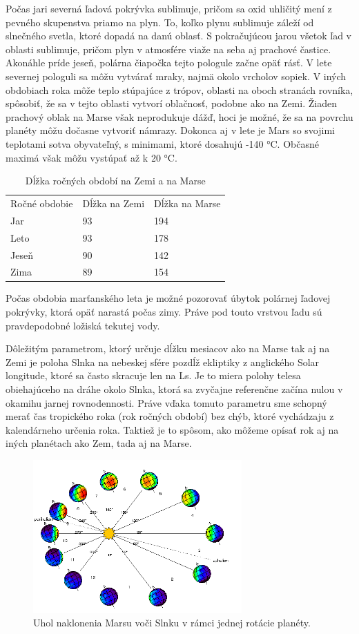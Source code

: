\newline Počas jari severná ľadová pokrývka sublimuje, pričom sa oxid uhličitý mení z pevného skupenstva priamo na plyn. To, koľko plynu sublimuje záleží od slnečného svetla, ktoré dopadá na danú oblasť. S pokračujúcou jarou všetok ľad v oblasti sublimuje, pričom plyn v atmosfére viaže na seba aj prachové častice. Akonáhle príde jeseň, polárna čiapočka tejto pologule začne opäť rásť. V lete severnej pologuli sa môžu vytvárať mraky, najmä okolo vrcholov sopiek. V iných obdobiach roka môže teplo stúpajúce z trópov, oblasti na oboch stranách rovníka, spôsobiť, že sa v tejto oblasti vytvorí oblačnosť, podobne ako na Zemi. Žiaden prachový oblak na Marse však neprodukuje dážď, hoci je možné, že sa na povrchu planéty môžu dočasne vytvoriť námrazy. Dokonca aj v lete je Mars so svojimi teplotami sotva obyvateľný, s minimami, ktoré dosahujú -140 °C. Občasné maximá však môžu vystúpať až k 20 °C.

\begin{table}[!htbp]
\caption{Dĺžka ročných období na Zemi a na Marse}
\centering
\begin{tabular}{lll}
Ročné obdobie & Dĺžka na Zemi & Dĺžka na Marse  \\
Jar           & 93            & 194             \\
Leto          & 93            & 178             \\
Jeseň         & 90            & 142             \\
Zima          & 89            & 154            
\end{tabular}
\end{table}
Počas obdobia marťanského leta je možné pozorovať úbytok polárnej ľadovej pokrývky, ktorá opäť narastá počas zimy. Práve pod touto vrstvou ľadu sú pravdepodobné ložiská tekutej vody.

Dôležitým parametrom, ktorý určuje dĺžku mesiacov ako na Marse tak aj na Zemi je poloha Slnka na nebeskej sfére pozdĺž ekliptiky z anglického Solar longitude, ktoré sa často skracuje len na Ls. Je to miera polohy telesa obiehajúceho na dráhe okolo Slnka, ktorá sa zvyčajne referenčne začína nulou v okamihu jarnej rovnodennosti. Práve vďaka tomuto parametru sme schopný merať čas tropického roka (rok ročných období) bez chýb, ktoré vychádzaju z kalendárneho určenia roka. Taktiež je to spôsom, ako môžeme opísať rok aj na iných planétach ako Zem, tada aj na Marse.
\begin{figure}[!htbp]
  \centering
  \includegraphics[width=8cm]{img/orbit.png}
  \caption{Uhol naklonenia Marsu voči Slnku v rámci jednej rotácie planéty.}
  \label{solarLS}
\end{figure}

